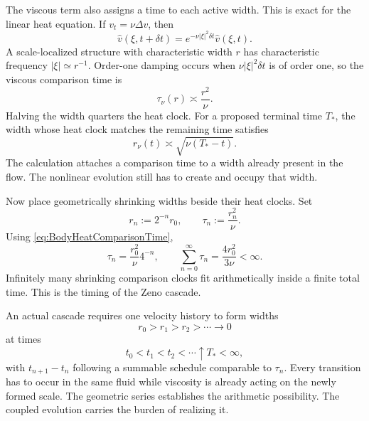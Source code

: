 
The viscous term also assigns a time to each active width.
This is exact for the linear heat equation.
If \(v_t=\nu\Delta v\), then
\[
  \widehat v(\xi,t+\delta t)
  =
  e^{-\nu|\xi|^2\delta t}\widehat v(\xi,t).
\]
A scale-localized structure with characteristic width \(r\) has characteristic frequency \(|\xi|\simeq r^{-1}\).
Order-one damping occurs when \(\nu|\xi|^2\delta t\) is of order one, so the viscous comparison time is
\begin{equation}\label{eq:BodyHeatComparisonTime}
  \tau_\nu(r)
  \asymp
  \frac{r^2}{\nu}.
\end{equation}
Halving the width quarters the heat clock.
For a proposed terminal time \(T_*\), the width whose heat clock matches the remaining time satisfies
\[
  r_\nu(t)
  \asymp
  \sqrt{\nu(T_*-t)}.
\]
The calculation attaches a comparison time to a width already present in the flow.
The nonlinear evolution still has to create and occupy that width.


Now place geometrically shrinking widths beside their heat clocks.
Set
\[
  r_n:=2^{-n}r_0,
  \qquad
  \tau_n:=\frac{r_n^2}{\nu}.
\]
Using \eqref{eq:BodyHeatComparisonTime},
\[
  \tau_n
  =
  \frac{r_0^2}{\nu}4^{-n},
  \qquad
  \sum_{n=0}^{\infty}\tau_n
  =
  \frac{4r_0^2}{3\nu}
  <
  \infty.
\]
Infinitely many shrinking comparison clocks fit arithmetically inside a finite total time.
This is the timing of the Zeno cascade.

An actual cascade requires one velocity history to form widths
\[
  r_0>r_1>r_2>\cdots\longrightarrow0
\]
at times
\[
  t_0<t_1<t_2<\cdots\uparrow T_*<\infty,
\]
with \(t_{n+1}-t_n\) following a summable schedule comparable to \(\tau_n\).
Every transition has to occur in the same fluid while viscosity is already acting on the newly formed scale.
The geometric series establishes the arithmetic possibility.
The coupled \NavierStokes{} evolution carries the burden of realizing it.

